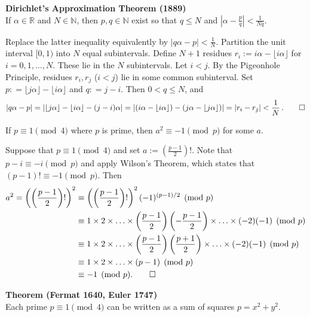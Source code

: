 \documentclass[a4paper]{article}
\let\oldendproof\endproof
\renewenvironment{proof}[1][\proofname]{%
  \oldproof[\scshape \noindent {\bfseries \text{Proof}}]%
}{\oldendproof}
\newcommand{\lemma}{\bigskip\noindent{\bf Lemma.}\;\;}
\newenvironment{thm}[1]{
	\begin{framed}
	\noindent
	{\bfseries #1}\\}{
	\end{framed}
}
\begin{document}
\begin{thm}{Dirichlet's Approximation Theorem (1889)}
If $\alpha \in \mathbb{R}$ and $N \in \mathbb{N}$,
then $p,q \in \mathbb{N}$ exist so that $q \leq N$ and $|\alpha - \frac{p}{q}| < \frac{1}{Nq}$.
\end{thm}

\begin{proof}
Replace the latter inequality equivalently by $| q\alpha - p| < \frac{1}{N}$.
Partition the unit interval $[0,1)$ into $N$ equal subintervals.
Define $N+1$ residues $r_i := i \alpha - \lfloor i\alpha \rfloor$ for $i = 0,1,\ldots, N$.
These lie in the $N$ subintervals.
Let $i<j$.
By the Pigeonhole Principle, residues $r_i, r_j$ ($i<j$) lie in some common subinterval.
Set $p: = \lfloor j\alpha \rfloor - \lfloor i \alpha \rfloor$ and $q: = j-i$.
Then $0 < q \leq N$, and
\[
  |q\alpha - p|
    = |\lfloor j\alpha \rfloor - \lfloor i\alpha \rfloor - (j-i)\alpha|
	= |(i\alpha - \lfloor i \alpha \rfloor) - (j\alpha - \lfloor j \alpha \rfloor)|
	= | r_i - r_j|
	< \frac{1}{N}\,.\qedhere
\]
\end{proof}

\lemma
If $p \equiv 1 \pmod 4$ where $p$ is prime, then $a^2 \equiv -1\pmod p$ for some $a$.

\begin{proof}
Suppose that $p \equiv 1 \pmod 4$ and set $a := \left(\frac{p-1}{2}\right)!$. Note that $p-i \equiv -i \pmod p$ and apply Wilson's Theorem, which states that $(p-1)! \equiv -1 \pmod p$. Then
\begin{align*}
	a^2 = \left(\left(\frac{p-1}{2}\right)!\right)^2
	& \equiv \left(\left(\frac{p-1}{2}\right)!\right)^2 (-1)^{(p-1)/2} \pmod p\\
	& \equiv 1 \times 2 \times \ldots \times \left(\frac{p-1}{2}\right)\left(-\frac{p-1}{2}\right) \times \ldots \times (-2)(-1) \pmod p\\
	& \equiv 1 \times 2 \times \ldots \times \left(\frac{p-1}{2}\right)\left(\frac{p+1}{2}\right) \times \ldots \times (-2)(-1) \pmod p\\
	& \equiv 1 \times 2 \times \ldots \times (p-1) \pmod p\\
	& \equiv -1 \pmod p. \qedhere
\end{align*}
\end{proof}

\begin{thm}{Theorem (Fermat 1640, Euler 1747)}
Each prime $p \equiv 1 \pmod 4$ can be written as a sum of squares $p = x^2 + y^2$.
\end{thm}
\end{document}

